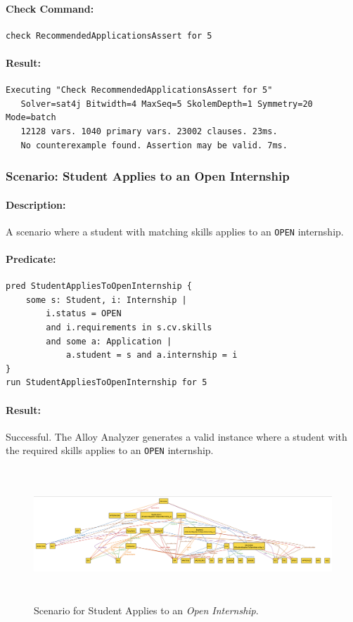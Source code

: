 \paragraph{Check Command:}
\begin{verbatim}
check RecommendedApplicationsAssert for 5
\end{verbatim}
\paragraph{Result:} 
\begin{verbatim}
Executing "Check RecommendedApplicationsAssert for 5"
   Solver=sat4j Bitwidth=4 MaxSeq=5 SkolemDepth=1 Symmetry=20 Mode=batch
   12128 vars. 1040 primary vars. 23002 clauses. 23ms.
   No counterexample found. Assertion may be valid. 7ms.
\end{verbatim}

\subsubsection{Scenario: Student Applies to an Open Internship}
\paragraph{Description:} A scenario where a student with matching skills applies to an \texttt{OPEN} internship.
\paragraph{Predicate:}
\begin{verbatim}
pred StudentAppliesToOpenInternship {
    some s: Student, i: Internship |
        i.status = OPEN
        and i.requirements in s.cv.skills
        and some a: Application |
            a.student = s and a.internship = i
}
run StudentAppliesToOpenInternship for 5
\end{verbatim}
\paragraph{Result:} Successful. The Alloy Analyzer generates a valid instance where a student with the required skills applies to an \texttt{OPEN} internship.

\begin{figure}[H]
    \centering
    \includegraphics[width=1\linewidth, height=5cm]{JhaBhatiaSharma/Images/Scenario 1.png}
    \caption{Scenario for Student Applies to an \textit{Open Internship}.}
    \label{fig:scenario1}
\end{figure}

